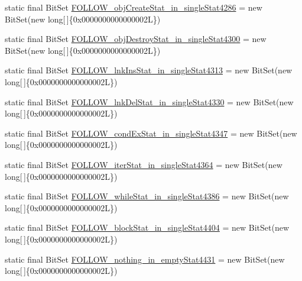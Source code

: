 \begin{DoxyCompactItemize}
static final Bit\-Set \hyperlink{classorg_1_1tzi_1_1use_1_1parser_1_1shell_1_1_shell_command_parser_ac267ae5fe6f88030ec70810c00a93163}{F\-O\-L\-L\-O\-W\-\_\-obj\-Create\-Stat\-\_\-in\-\_\-single\-Stat4286} = new Bit\-Set(new long\mbox{[}$\,$\mbox{]}\{0x0000000000000002\-L\})
\item 
static final Bit\-Set \hyperlink{classorg_1_1tzi_1_1use_1_1parser_1_1shell_1_1_shell_command_parser_ad65cccc8e1ca8447416ab49357802dfb}{F\-O\-L\-L\-O\-W\-\_\-obj\-Destroy\-Stat\-\_\-in\-\_\-single\-Stat4300} = new Bit\-Set(new long\mbox{[}$\,$\mbox{]}\{0x0000000000000002\-L\})
\item 
static final Bit\-Set \hyperlink{classorg_1_1tzi_1_1use_1_1parser_1_1shell_1_1_shell_command_parser_a198256a2ebeebe70ce4a9ee16efb4f68}{F\-O\-L\-L\-O\-W\-\_\-lnk\-Ins\-Stat\-\_\-in\-\_\-single\-Stat4313} = new Bit\-Set(new long\mbox{[}$\,$\mbox{]}\{0x0000000000000002\-L\})
\item 
static final Bit\-Set \hyperlink{classorg_1_1tzi_1_1use_1_1parser_1_1shell_1_1_shell_command_parser_a1373d52f7ec4cfa89a806589e7557d95}{F\-O\-L\-L\-O\-W\-\_\-lnk\-Del\-Stat\-\_\-in\-\_\-single\-Stat4330} = new Bit\-Set(new long\mbox{[}$\,$\mbox{]}\{0x0000000000000002\-L\})
\item 
static final Bit\-Set \hyperlink{classorg_1_1tzi_1_1use_1_1parser_1_1shell_1_1_shell_command_parser_a2437fd5ebe17a505ecd5520698ce1f64}{F\-O\-L\-L\-O\-W\-\_\-cond\-Ex\-Stat\-\_\-in\-\_\-single\-Stat4347} = new Bit\-Set(new long\mbox{[}$\,$\mbox{]}\{0x0000000000000002\-L\})
\item 
static final Bit\-Set \hyperlink{classorg_1_1tzi_1_1use_1_1parser_1_1shell_1_1_shell_command_parser_a0bcb720579d87cf21dd810d70c561e43}{F\-O\-L\-L\-O\-W\-\_\-iter\-Stat\-\_\-in\-\_\-single\-Stat4364} = new Bit\-Set(new long\mbox{[}$\,$\mbox{]}\{0x0000000000000002\-L\})
\item 
static final Bit\-Set \hyperlink{classorg_1_1tzi_1_1use_1_1parser_1_1shell_1_1_shell_command_parser_a0d4242de0950c563c63d943d3998fc8d}{F\-O\-L\-L\-O\-W\-\_\-while\-Stat\-\_\-in\-\_\-single\-Stat4386} = new Bit\-Set(new long\mbox{[}$\,$\mbox{]}\{0x0000000000000002\-L\})
\item 
static final Bit\-Set \hyperlink{classorg_1_1tzi_1_1use_1_1parser_1_1shell_1_1_shell_command_parser_a9dd479024808f23d27044276f668c0e3}{F\-O\-L\-L\-O\-W\-\_\-block\-Stat\-\_\-in\-\_\-single\-Stat4404} = new Bit\-Set(new long\mbox{[}$\,$\mbox{]}\{0x0000000000000002\-L\})
\item 
static final Bit\-Set \hyperlink{classorg_1_1tzi_1_1use_1_1parser_1_1shell_1_1_shell_command_parser_a645215ea34c532b5db3fed84e776896f}{F\-O\-L\-L\-O\-W\-\_\-nothing\-\_\-in\-\_\-empty\-Stat4431} = new Bit\-Set(new long\mbox{[}$\,$\mbox{]}\{0x0000000000000002\-L\})

\end{DoxyCompactItemize}
